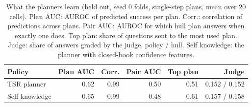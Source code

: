 \begin{table}[t]
\centering\footnotesize
\setlength{\tabcolsep}{2.4pt}
\caption{What the planners learn (held out, seed 0 folds, single-step plans, mean over 20 cells). Plan AUC: AUROC of predicted success per plan. Corr.: correlation of predictions across plans. Pair AUC: AUROC for which hull plan answers when exactly one does. Top plan: share of questions sent to the most used plan. Judge: share of answers graded by the judge, policy / hull. Self knowledge: the planner with closed-book confidence features.}
\label{tab:p_mechanism}
\begin{tabular*}{\linewidth}{@{\extracolsep{\fill}}lrrrrr@{}}
\toprule
Policy & Plan AUC & Corr. & Pair AUC & Top plan & Judge \\
\midrule
TSR planner & 0.62 & 0.99 & 0.50 & 0.51 & 0.152 / 0.152 \\
Self knowledge & 0.65 & 0.99 & 0.48 & 0.61 & 0.157 / 0.158 \\
\bottomrule
\end{tabular*}
\end{table}
